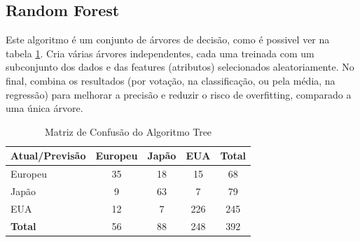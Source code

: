\documentclass[conference]{IEEEtran}
\begin{document}
\subsection{Random Forest}
Este algoritmo é um conjunto de árvores de decisão, como é possivel ver na tabela \ref{tab:conf_matrix_forest}. Cria várias árvores
independentes, cada uma treinada com um subconjunto dos dados e das features (atributos) selecionados aleatoriamente. No final,
combina os resultados (por votação, na classificação, ou pela média, na regressão) para melhorar a precisão e reduzir o risco de
overfitting, comparado a uma única árvore.
\begin{table}[!ht]
	\centering
	\begin{tabular}{lcccc}
		\toprule
		\textbf{Atual/Previsão} & \textbf{Europeu} & \textbf{Japão} & \textbf{EUA} & \textbf{Total} \\
		\midrule
		Europeu                 & 35               & 18             & 15           & 68             \\
		Japão                   & 9                & 63             & 7            & 79             \\
		EUA                     & 12               & 7              & 226          & 245            \\
		\midrule
		\textbf{Total}          & 56               & 88             & 248          & 392            \\
		\bottomrule
	\end{tabular}
	\label{tab:conf_matrix_forest}
	\caption{Matriz de Confusão do Algoritmo Tree}
\end{table}

\end{document}
